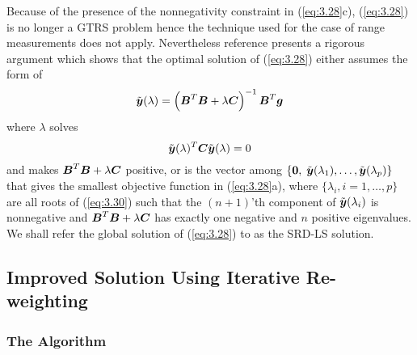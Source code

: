 Because of the presence of the nonnegativity constraint in (\ref{eq:3.28}c), (\ref{eq:3.28}) is no longer a GTRS problem hence the technique used for the case of range measurements does not apply. Nevertheless reference \cite{BeckStLi} presents a rigorous argument which shows that the optimal solution of (\ref{eq:3.28}) either assumes the form of
 \begin{equation}
 \nonumber
 \tilde{\mbox{\boldmath$y$}}(\lambda)=\left(\mbox{\boldmath$B$}^T\mbox{\boldmath$B$}+\lambda\mbox{\boldmath$C$}\right)^{-1}\mbox{\boldmath$B$}^T\mbox{\boldmath$g$}
 \end{equation}
 where $\lambda$ solves
 \begin{equation}\label{eq:3.30}
 \tilde{\mbox{\boldmath$y$}}(\lambda)^T\mbox{\boldmath$C$}\tilde{\mbox{\boldmath$y$}}(\lambda)=0
 \end{equation}
 and makes $\mbox{\boldmath$B$}^T\mbox{\boldmath$B$}+\lambda\mbox{\boldmath$C$}$ positive, or is the vector among $\{\mbox{\boldmath{$0$}},$ $\tilde{\mbox{\boldmath$y$}}(\lambda_1),\ldots,\tilde{\mbox{\boldmath$y$}}(\lambda_p)\}$ that gives the smallest objective function in (\ref{eq:3.28}a), where $\{\lambda_i, i = 1,\ldots,p\}$ are all roots of (\ref{eq:3.30}) such that the $(n+1)$'th component of $\tilde{\mbox{\boldmath$y$}}(\lambda_i)$ is nonnegative and $\mbox{\boldmath$B$}^T\mbox{\boldmath$B$}+\lambda\mbox{\boldmath$C$}$ has exactly one negative and $n$ positive eigenvalues. We shall refer the global solution of (\ref{eq:3.28}) to as the SRD-LS solution.

\subsection{Improved Solution Using Iterative Re-weighting} %
\subsubsection{The Algorithm} %

